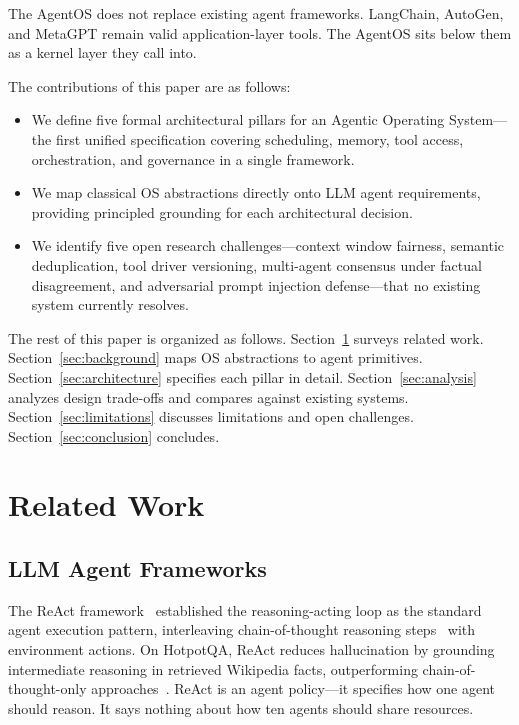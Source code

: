 \documentclass[journal]{IEEEtran}
\begin{document}
The AgentOS does not replace existing agent frameworks. LangChain, AutoGen, and MetaGPT remain valid application-layer tools. The AgentOS sits below them as a kernel layer they call into.

The contributions of this paper are as follows:
\begin{itemize}
  \item We define five formal architectural pillars for an Agentic Operating System---the first unified specification covering scheduling, memory, tool access, orchestration, and governance in a single framework.
  \item We map classical OS abstractions directly onto LLM agent requirements, providing principled grounding for each architectural decision.
  \item We identify five open research challenges---context window fairness, semantic deduplication, tool driver versioning, multi-agent consensus under factual disagreement, and adversarial prompt injection defense---that no existing system currently resolves.
\end{itemize}

The rest of this paper is organized as follows. Section~\ref{sec:related} surveys related work. Section~\ref{sec:background} maps OS abstractions to agent primitives. Section~\ref{sec:architecture} specifies each pillar in detail. Section~\ref{sec:analysis} analyzes design trade-offs and compares against existing systems. Section~\ref{sec:limitations} discusses limitations and open challenges. Section~\ref{sec:conclusion} concludes.

\section{Related Work}
\label{sec:related}

\subsection{LLM Agent Frameworks}

The ReAct framework~\cite{yao2023react} established the reasoning-acting loop as the standard agent execution pattern, interleaving chain-of-thought reasoning steps~\cite{wei2022cot} with environment actions. On HotpotQA, ReAct reduces hallucination by grounding intermediate reasoning in retrieved Wikipedia facts, outperforming chain-of-thought-only approaches~\cite{yao2023react}. ReAct is an agent policy---it specifies how one agent should reason. It says nothing about how ten agents should share resources.
\end{document}
